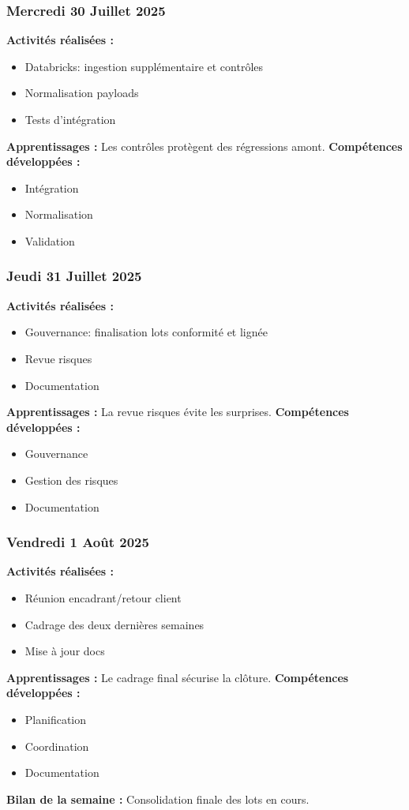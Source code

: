 \documentclass[12pt,a4paper]{article}
\begin{document}
\subsubsection{Mercredi 30 Juillet 2025}
\textbf{Activités réalisées :}
\begin{itemize}
    \item Databricks: ingestion supplémentaire et contrôles
    \item Normalisation payloads
    \item Tests d'intégration
\end{itemize}
\textbf{Apprentissages :} Les contrôles protègent des régressions amont.
\textbf{Compétences développées :}
\begin{itemize}
    \item Intégration
    \item Normalisation
    \item Validation
\end{itemize}

\subsubsection{Jeudi 31 Juillet 2025}
\textbf{Activités réalisées :}
\begin{itemize}
    \item Gouvernance: finalisation lots conformité et lignée
    \item Revue risques
    \item Documentation
\end{itemize}
\textbf{Apprentissages :} La revue risques évite les surprises.
\textbf{Compétences développées :}
\begin{itemize}
    \item Gouvernance
    \item Gestion des risques
    \item Documentation
\end{itemize}

\subsubsection{Vendredi 1 Août 2025}
\textbf{Activités réalisées :}
\begin{itemize}
    \item Réunion encadrant/retour client
    \item Cadrage des deux dernières semaines
    \item Mise à jour docs
\end{itemize}
\textbf{Apprentissages :} Le cadrage final sécurise la clôture.
\textbf{Compétences développées :}
\begin{itemize}
    \item Planification
    \item Coordination
    \item Documentation
\end{itemize}
\textbf{Bilan de la semaine :} Consolidation finale des lots en cours.
\end{document}
